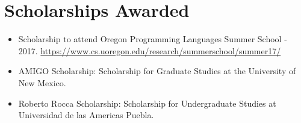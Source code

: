 \section{Scholarships Awarded}

\begin{itemize}

  \item Scholarship to attend Oregon Programming Languages Summer School - 2017.
    \url{https://www.cs.uoregon.edu/research/summerschool/summer17/}
  \item AMIGO Scholarship: Scholarship for Graduate Studies
    at the University of New Mexico.
  \item Roberto Rocca Scholarship: Scholarship for Undergraduate
    Studies at Universidad de las Americas Puebla.
\end{itemize}


